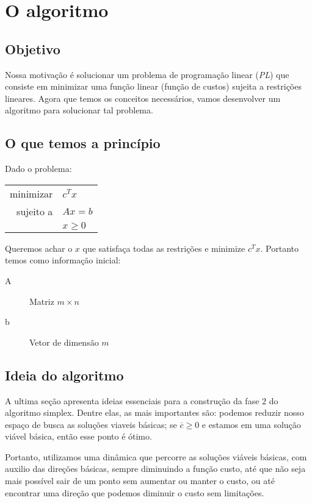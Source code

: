 \documentclass[12pt]{article}
\begin{document}
    
    
\section{O algoritmo}

\subsection{Objetivo}
	Nossa motivação é solucionar um problema de programação linear (\emph{PL}) que consiste em minimizar uma função linear (função de custos) sujeita a restrições lineares. Agora que temos os conceitos necessários, vamos desenvolver um algoritmo para solucionar tal problema.

\subsection{O que temos a princípio}
	Dado o problema:
    \begin{center}
    	\begin{tabular}{r l}
	  		minimizar & $c^Tx$ \\
        
        	sujeito a & $Ax = b$ \\
            & $x \geq 0$ \\
        \end{tabular}
    \end{center}
  
	Queremos achar o $x$ que satisfaça todas as restrições e minimize $c^Tx$. Portanto temos como informação inicial: 
	\begin{description}
		\item[A] Matriz $m \times n$
		\item[b] Vetor de dimensão $m$
	\end{description}


\subsection{Ideia do algoritmo}
	A ultima seção apresenta ideias essenciais para a construção da fase 2 do algoritmo simplex. Dentre elas, as mais importantes são: podemos reduzir nosso espaço de busca as soluções viaveis básicas; se $\overline{c} \geq 0$ e estamos em uma solução viável básica, então esse ponto é ótimo.
    
    Portanto, utilizamos uma dinâmica que percorre as soluções viáveis básicas, com auxilio das direções básicas, sempre diminuindo a função custo, até que não seja mais possível sair de um ponto sem aumentar ou manter o custo, ou até encontrar uma direção que podemos diminuir o custo sem limitações.
    
\end{document}
